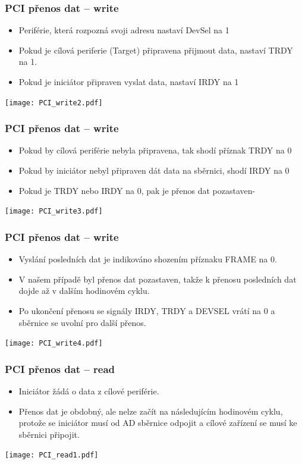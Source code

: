 \documentclass{beamer}
\begin{document}
\begin{frame}
\frametitle{PCI přenos dat -- write}

\begin{itemize}
\item Periférie, která rozpozná svoji adresu nastaví DevSel na 1
\item Pokud je cílová periferie (Target) připravena přijmout data, nastaví TRDY na 1. 
\item Pokud je iniciátor připraven vyslat data, nastaví IRDY na 1
\end{itemize}

\texttt{[image: PCI\_write2.pdf]}

\end{frame}


\begin{frame}
\frametitle{PCI přenos dat -- write}

\begin{itemize}
\item Pokud by cílová periférie nebyla připravena, tak shodí příznak TRDY na 0
\item Pokud by iniciátor nebyl připraven dát data na sběrnici, shodí IRDY na 0 
\item Pokud je TRDY nebo IRDY na 0, pak je přenos dat pozastaven-
\end{itemize}

\texttt{[image: PCI\_write3.pdf]}

\end{frame}


\begin{frame}
\frametitle{PCI přenos dat -- write}

\begin{itemize}
\item Vyslání posledních dat je indikováno shozením příznaku FRAME na 0.
\item V našem případě byl přenos dat pozastaven, takže k přenosu posledních dat dojde až v dalším hodinovém cyklu.
\item Po ukončení přenosu se signály IRDY, TRDY a DEVSEL vrátí na 0 a sběrnice se uvolní pro další přenos.
\end{itemize}

\texttt{[image: PCI\_write4.pdf]}

\end{frame}


\begin{frame}
\frametitle{PCI přenos dat -- read}

\begin{itemize}
\item Iniciátor žádá o data z cílové periférie.
\item Přenos dat je obdobný, ale nelze začít na následujícím hodinovém cyklu, protože se iniciátor musí od AD sběrnice odpojit a cílové zařízení se musí ke sběrnici připojit.
\end{itemize}

\texttt{[image: PCI\_read1.pdf]}

\end{frame}
\end{document}

